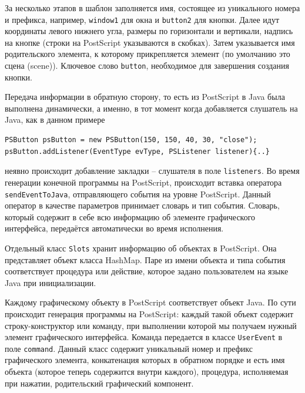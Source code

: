 За несколько этапов в шаблон заполняется имя, состоящее из уникального номера и префикса, например, \texttt{window1} для окна и \texttt{button2} для кнопки. Далее идут координаты левого нижнего угла, размеры по горизонтали и вертикали, надпись на кнопке (строки на PostScript указываются в скобках). Затем указывается имя родительского элемента, к которому прикрепляется элемент (по умолчанию это сцена (scene)). Ключевое слово \texttt{button}, необходимое для завершения создания кнопки.

Передача информации в обратную сторону, то есть из PostScript в Java была выполнена динамически, а именно, в тот момент когда добавляется слушатель на Java, как в данном примере 


\lstset{language=Java,basicstyle=\footnotesize\ttfamily} 
\begin{lstlisting}
PSButton psButton = new PSButton(150, 150, 40, 30, "close");
psButton.addListener(EventType evType, PSListener listener){..}
\end{lstlisting}

неявно происходит добавление закладки -- слушателя в поле \texttt{listeners}. Во время генерации конечной программы на PostScript, происходит вставка оператора \texttt{sendEventToJava}, отправляющего события на уровне PostScript. Данный оператор в качестве параметров принимает словарь и тип события. Словарь, который содержит в себе всю информацию об элементе графического интерфейса, передаётся автоматически во время исполнения.

Отдельный класс \texttt{Slots} хранит информацию об объектах в PostScript. Она представляет объект класса HashMap. Паре из имени объекта и типа события соответствует процедура или действие, которое задано пользователем на языке Java при инициализации. 


Каждому графическому объекту в PostScript соответствует объект Java. По сути происходит генерация программы на PostScript: каждый такой объект содержит строку-конструктор или команду, при выполнении которой мы получаем нужный элемент графического интерфейса. Команда передается в классе \texttt{UserEvent} в поле \texttt{command}. Данный класс содержит уникальный номер и префикс графического элемента, конкатенация которых в обратном порядке и есть имя объекта (которое теперь содержится внутри каждого), процедура, исполняемая при нажатии, родительский графический компонент.


